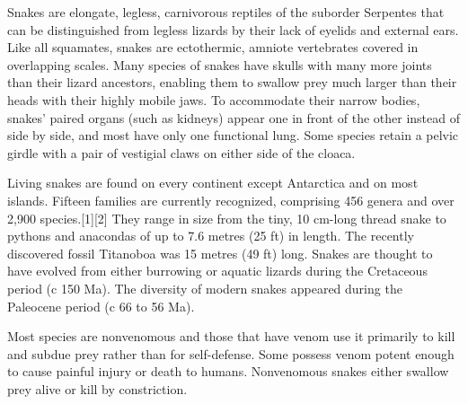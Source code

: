Snakes are elongate, legless, carnivorous reptiles of the suborder Serpentes that can be distinguished from legless lizards by their lack of eyelids and external ears. Like all squamates, snakes are ectothermic, amniote vertebrates covered in overlapping scales. Many species of snakes have skulls with many more joints than their lizard ancestors, enabling them to swallow prey much larger than their heads with their highly mobile jaws. To accommodate their narrow bodies, snakes' paired organs (such as kidneys) appear one in front of the other instead of side by side, and most have only one functional lung. Some species retain a pelvic girdle with a pair of vestigial claws on either side of the cloaca.

Living snakes are found on every continent except Antarctica and on most islands. Fifteen families are currently recognized, comprising 456 genera and over 2,900 species.[1][2] They range in size from the tiny, 10 cm-long thread snake to pythons and anacondas of up to 7.6 metres (25 ft) in length. The recently discovered fossil Titanoboa was 15 metres (49 ft) long. Snakes are thought to have evolved from either burrowing or aquatic lizards during the Cretaceous period (c 150 Ma). The diversity of modern snakes appeared during the Paleocene period (c 66 to 56 Ma).

Most species are nonvenomous and those that have venom use it primarily to kill and subdue prey rather than for self-defense. Some possess venom potent enough to cause painful injury or death to humans. Nonvenomous snakes either swallow prey alive or kill by constriction.
